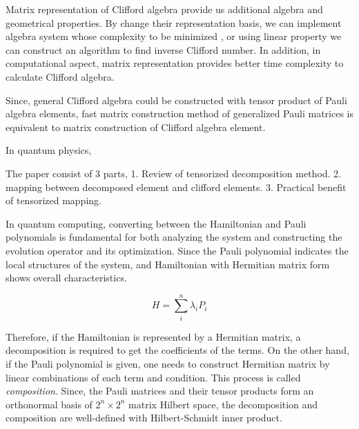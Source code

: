 \documentclass[twocolumn]{article}
\begin{document}
Matrix representation of Clifford algebra provide us 
additional algebra and geometrical properties.
By change their representation basis, 
we can implement algebra system whose complexity to be minimized
\cite{budinich_computational_2009},
or using linear property we can construct an algorithm to find inverse
Clifford number\cite{dorst_clifford_2002}.
In addition, in computational aspect, matrix representation provides 
better time complexity to calculate Clifford algebra\cite{budinich_computational_2009}.

Since, general Clifford algebra could be constructed with 
tensor product of Pauli algebra elements\cite{vlasov2002notesweylcliffordalgebras},
fast matrix construction method of generalized Pauli matrices 
is equivalent to matrix construction of Clifford algebra element.

In quantum physics, 


The paper consist of 3 parts, 
1. Review of tensorized decomposition method.
2. mapping between decomposed element and clifford elements.
3. Practical benefit of tensorized mapping. 



In quantum computing, converting between the Hamiltonian and Pauli polynomials is fundamental 
for both analyzing the system and constructing the evolution operator and its optimization.
Since the Pauli polynomial indicates the local structures of the system,
and Hamiltonian with Hermitian matrix form shows overall characteristics.

\begin{equation}
    H = \sum_i^n \lambda_i P_i
\end{equation}

Therefore, if the Hamiltonian is represented by a Hermitian matrix, 
a decomposition is required to get the coefficients of the terms. 
On the other hand, if the Pauli polynomial is given, 
one needs to construct Hermitian matrix by linear combinations of each term and condition.
This process is called \textit{composition}.
Since, the Pauli matrices and their tensor products form an orthonormal basis 
of $2^n \times 2^n$ matrix Hilbert space\cite{nielsen2010quantum}, 
the decomposition and composition are well-defined with Hilbert-Schmidt inner product. 
\end{document}
